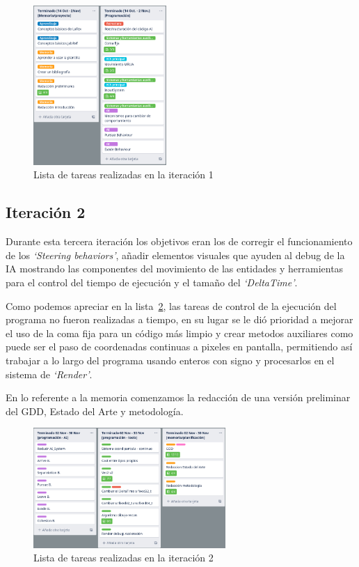 \begin{figure}[ht]
\centering
\includegraphics[width=0.45\textwidth]{imagenes/metodologia/tareas_it1.png}
\caption{Lista de tareas realizadas en la iteración 1}
\label{img:it_1}
\end{figure}

\subsection{Iteración 2}
Durante esta tercera iteración los objetivos eran los de corregir el funcionamiento de los
\textit{`Steering behaviors'}, añadir elementos visuales que ayuden al debug de la \ac{IA}
mostrando las componentes del movimiento de las entidades y herramientas para el control del
tiempo de ejecución y el tamaño del \textit{`DeltaTime'}.

Como podemos apreciar en la lista~\ref{img:it_2}, las tareas de control de la ejecución del
programa no fueron realizadas a tiempo, en su lugar se le dió prioridad a mejorar el uso
de la coma fija para un código más limpio y crear metodos auxiliares como puede ser el paso de
coordenadas continuas a pixeles en pantalla, permitiendo así trabajar a lo largo del programa 
usando enteros con signo y procesarlos en el sistema de \textit{`Render'}.

En lo referente a la memoria comenzamos la redacción de una versión preliminar del \ac{GDD},
Estado del Arte y metodología. 

\begin{figure}[ht]
\centering
\includegraphics[width=0.65\textwidth]{imagenes/metodologia/tareas_it2.png}
\caption{Lista de tareas realizadas en la iteración 2}
\label{img:it_2}
\end{figure}


